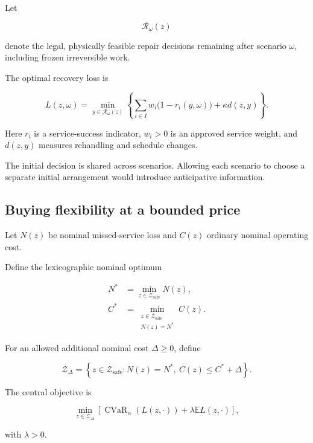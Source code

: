 \documentclass[10pt,a4paper]{article}
\DeclareMathOperator{\CVaR}{CVaR}
\newcommand{\EE}{\mathbb{E}}
\theoremstyle{plain}
\theoremstyle{definition}
\theoremstyle{remark}
\begin{document}
Let

\[
\mathcal R_\omega(z)
\]

denote the legal, physically feasible repair
decisions remaining after scenario \(\omega\),
including frozen irreversible work.

The optimal recovery loss is

\begin{equation}
L(z,\omega)=
\min_{y\in\mathcal R_\omega(z)}
\left\{
\sum_{i\in I}
w_i\bigl(1-r_i(y,\omega)\bigr)
+\kappa d(z,y)
\right\}.
\label{eq:recourse}
\end{equation}

Here \(r_i\) is a service-success indicator,
\(w_i>0\) is an approved service weight,
and \(d(z,y)\) measures rehandling
and schedule changes.

The initial decision is shared across scenarios.
Allowing each scenario to choose a separate
initial arrangement would introduce
anticipative information.

\subsection{Buying flexibility at a bounded price}

Let \(N(z)\) be nominal missed-service loss
and \(C(z)\) ordinary nominal operating cost.

Define the lexicographic nominal optimum

\begin{align}
N^*
&=
\min_{z\in\mathcal Z_{\mathrm{safe}}}N(z),
\\
C^*
&=
\min_{\substack{
z\in\mathcal Z_{\mathrm{safe}}\\
N(z)=N^*
}}
C(z).
\end{align}

For an allowed additional nominal cost
\(\Delta\geq0\), define

\begin{equation}
\mathcal Z_\Delta=
\left\{
z\in\mathcal Z_{\mathrm{safe}}:
N(z)=N^*,
\ C(z)\leq C^*+\Delta
\right\}.
\label{eq:nominalbudget}
\end{equation}

The central objective is

\begin{equation}
\min_{z\in\mathcal Z_\Delta}
\left[
\CVaR_\alpha(L(z,\cdot))
+
\lambda\EE L(z,\cdot)
\right],
\label{eq:model1}
\end{equation}

with \(\lambda>0\).
\end{document}
